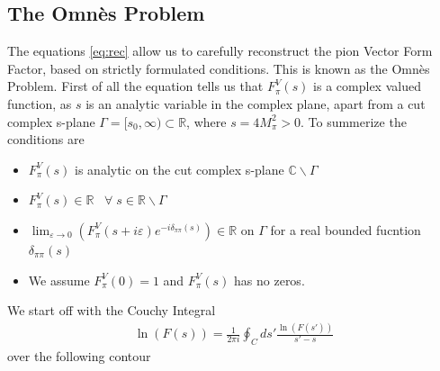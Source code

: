 \documentclass[a4paper]{article}
\begin{document}
\subsection{The Omn\`es Problem}
The equations \ref{eq:rec} allow us to carefully reconstruct the pion Vector Form
Factor, based on strictly formulated conditions. This is known as the Omn\`es
Problem. First of all the equation tells us that $F_\pi^V(s)$ is a complex
valued function, as $s$ is an analytic variable in the complex plane, apart
from a cut complex s-plane $\Gamma = [s_0, \infty) \subset \mathbb{R}$, where
$s = 4M_\pi^2 > 0$. To summerize the conditions are
\begin{itemize}
    \item $F_\pi^V(s)$ is analytic on the cut complex s-plane
        $\mathbb{C}\backslash \Gamma$
    \item $F_\pi^V(s)\in \mathbb{R} \;\;\; \forall\; s \in
        \mathbb{R}\backslash \Gamma$
    \item $\lim_{\varepsilon \rightarrow 0}(F_\pi^V(s+i\varepsilon)
        e^{-i\delta_{\pi\pi}(s)}) \in \mathbb{R}$ on $\Gamma$ for a real
        bounded fucntion $\delta_{\pi\pi}(s)$
    \item We assume $F_\pi^V(0) = 1$ and $F_\pi^V(s)$ has no zeros.
\end{itemize}
We start off with the Couchy Integral
\begin{align}
    \ln(F(s)) = \frac{1}{2\pi i}\oint_C ds' \frac{\ln(F(s'))}{s'-s}
\end{align}
over the following contour
\begin{center}
\end{center}
\end{document}
